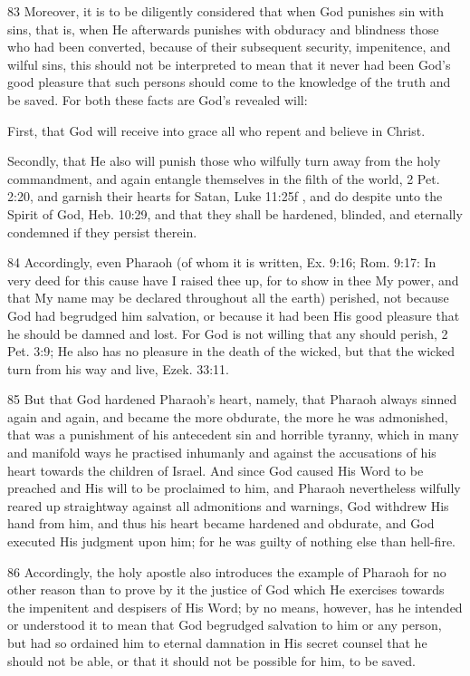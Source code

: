 {83 Moreover, it is to be diligently considered that when God punishes sin with sins, that is, when He afterwards punishes with obduracy and blindness those who had been converted, because of their subsequent security, impenitence, and wilful sins, this should not be interpreted to mean that it never had been God’s good pleasure that such persons should come to the knowledge of the truth and be saved. For both these facts are God’s revealed will:

First, that God will receive into grace all who repent and believe in Christ.

Secondly, that He also will punish those who wilfully turn away from the holy commandment, and again entangle themselves in the filth of the world, 2 Pet. 2:20, and garnish their hearts for Satan, Luke 11:25f , and do despite unto the Spirit of God, Heb. 10:29, and that they shall be hardened, blinded, and eternally condemned if they persist therein.

84 Accordingly, even Pharaoh (of whom it is written, Ex. 9:16; Rom. 9:17: In very deed for this cause have I raised thee up, for to show in thee My power, and that My name may be declared throughout all the earth) perished, not because God had begrudged him salvation, or because it had been His good pleasure that he should be damned and lost. For God is not willing that any should perish, 2 Pet. 3:9; He also has no pleasure in the death of the wicked, but that the wicked turn from his way and live, Ezek. 33:11.

85 But that God hardened Pharaoh’s heart, namely, that Pharaoh always sinned again and again, and became the more obdurate, the more he was admonished, that was a punishment of his antecedent sin and horrible tyranny, which in many and manifold ways he practised inhumanly and against the accusations of his heart towards the children of Israel. And since God caused His Word to be preached and His will to be proclaimed to him, and Pharaoh nevertheless wilfully reared up straightway against all admonitions and warnings, God withdrew His hand from him, and thus his heart became hardened and obdurate, and God executed His judgment upon him; for he was guilty of nothing else than hell-fire.

86 Accordingly, the holy apostle also introduces the example of Pharaoh for no other reason than to prove by it the justice of God which He exercises towards the impenitent and despisers of His Word; by no means, however, has he intended or understood it to mean that God begrudged salvation to him or any person, but had so ordained him to eternal damnation in His secret counsel that he should not be able, or that it should not be possible for him, to be saved.

}
